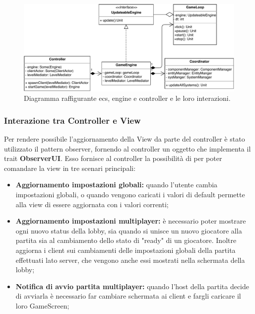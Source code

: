 \begin{figure}[H]
	\centering
	\includegraphics[width=\columnwidth]{drawio/ECS-engine-controller/ecs-engine-controller.pdf}
	\caption{Diagramma raffigurante ecs, engine e controller e le loro interazioni.}
	\label{fig:ecs-engine-controller}
\end{figure}



\subsubsection{Interazione tra Controller e View}
Per rendere possibile l'aggiornamento della View da parte del controller è stato utilizzato il pattern observer, fornendo al controller un oggetto che implementa il trait \textbf{ObserverUI}. Esso fornisce al controller la possibilità di per poter comandare la view in tre scenari principali:


\begin{itemize}
    \item \textbf{Aggiornamento impostazioni globali:} quando l'utente cambia impostazioni globali, o quando vengono caricati i valori di default permette alla view di essere aggiornata con i valori correnti;
    
    \item \textbf{Aggiornamento impostazioni multiplayer:} è necessario poter mostrare ogni nuovo status della lobby, sia quando si unisce un nuovo giocatore alla partita sia al cambiamento dello stato di "ready" di un giocatore. Inoltre aggiorna i client sui cambiamenti delle impostazioni globali della partita effettuati lato server, che vengono anche essi mostrati nella schermata della lobby;
    
    \item \textbf{Notifica di avvio partita multiplayer:} quando l'host della partita decide di avviarla è necessario far cambiare schermata ai client e fargli caricare il loro GameScreen;
    
\end{itemize}

